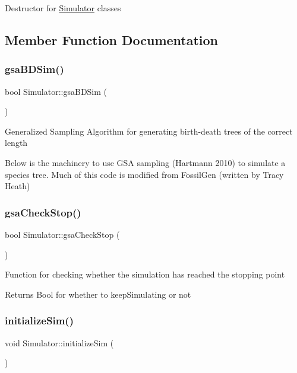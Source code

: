 Destructor for \mbox{\hyperlink{class_simulator}{Simulator}} classes 

\subsection{Member Function Documentation}
\mbox{\label{class_simulator_aa48bbe1603f0f11e9d0a73bd6764de25}} 
\subsubsection{\texorpdfstring{gsaBDSim()}{gsaBDSim()}}
{\footnotesize\ttfamily bool Simulator\+::gsa\+B\+D\+Sim (\begin{DoxyParamCaption}{ }\end{DoxyParamCaption})}

Generalized Sampling Algorithm for generating birth-\/death trees of the correct length

Below is the machinery to use G\+SA sampling (Hartmann 2010) to simulate a species tree. Much of this code is modified from Fossil\+Gen (written by Tracy Heath) \mbox{\label{class_simulator_a4773bc1cd4fb3b407044dd8db796b297}} 
\subsubsection{\texorpdfstring{gsaCheckStop()}{gsaCheckStop()}}
{\footnotesize\ttfamily bool Simulator\+::gsa\+Check\+Stop (\begin{DoxyParamCaption}{ }\end{DoxyParamCaption})}

Function for checking whether the simulation has reached the stopping point \begin{DoxyReturn}{Returns}
Bool for whether to keep\+Simulating or not 
\end{DoxyReturn}
\mbox{\label{class_simulator_a7146d0d7fffe8f78d99a1956ba51bc11}} 
\subsubsection{\texorpdfstring{initializeSim()}{initializeSim()}}
{\footnotesize\ttfamily void Simulator\+::initialize\+Sim (\begin{DoxyParamCaption}{ }\end{DoxyParamCaption})}


